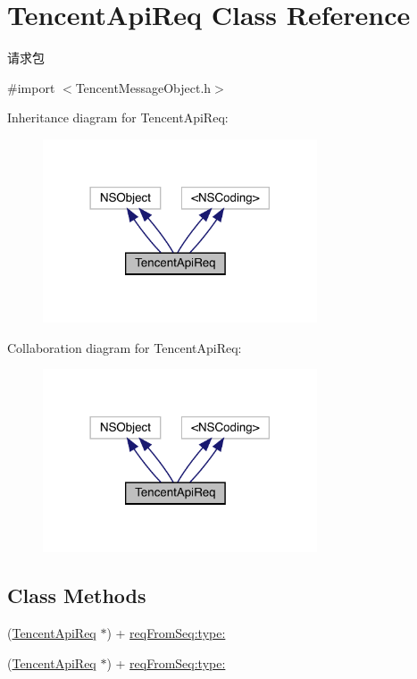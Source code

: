 \hypertarget{interface_tencent_api_req}{}\section{Tencent\+Api\+Req Class Reference}
\label{interface_tencent_api_req}


请求包  




{\ttfamily \#import $<$Tencent\+Message\+Object.\+h$>$}



Inheritance diagram for Tencent\+Api\+Req\+:\nopagebreak
\begin{figure}[H]
\begin{center}
\leavevmode
\includegraphics[width=230pt]{interface_tencent_api_req__inherit__graph}
\end{center}
\end{figure}


Collaboration diagram for Tencent\+Api\+Req\+:\nopagebreak
\begin{figure}[H]
\begin{center}
\leavevmode
\includegraphics[width=230pt]{interface_tencent_api_req__coll__graph}
\end{center}
\end{figure}
\subsection*{Class Methods}
\begin{DoxyCompactItemize}
\item 
(\mbox{\hyperlink{interface_tencent_api_req}{Tencent\+Api\+Req}} $\ast$) + \mbox{\hyperlink{interface_tencent_api_req_ae0301f606ff6da9edd28298b1f59df10}{req\+From\+Seq\+:type\+:}}
\item 
(\mbox{\hyperlink{interface_tencent_api_req}{Tencent\+Api\+Req}} $\ast$) + \mbox{\hyperlink{interface_tencent_api_req_ae0301f606ff6da9edd28298b1f59df10}{req\+From\+Seq\+:type\+:}}
\end{DoxyCompactItemize}
